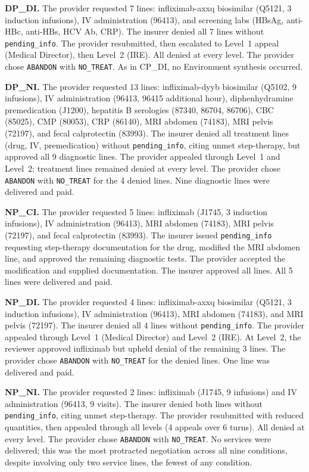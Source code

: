 \textbf{DP\_DI.} The provider requested 7 lines: infliximab-axxq biosimilar (Q5121, 3 induction infusions), IV administration (96413), and screening labs (HBsAg, anti-HBc, anti-HBs, HCV Ab, CRP). The insurer denied all 7 lines without \texttt{pending\_info}. The provider resubmitted, then escalated to Level~1 appeal (Medical Director), then Level~2 (IRE). All denied at every level. The provider chose \texttt{ABANDON} with \texttt{NO\_TREAT}. As in CP\_DI, no Environment synthesis occurred.

\textbf{DP\_NI.} The provider requested 13 lines: infliximab-dyyb biosimilar (Q5102, 9 infusions), IV administration (96413, 96415 additional hour), diphenhydramine premedication (J1200), hepatitis B serologies (87340, 86704, 86706), CBC (85025), CMP (80053), CRP (86140), MRI abdomen (74183), MRI pelvis (72197), and fecal calprotectin (83993). The insurer denied all treatment lines (drug, IV, premedication) without \texttt{pending\_info}, citing unmet step-therapy, but approved all 9 diagnostic lines. The provider appealed through Level~1 and Level~2; treatment lines remained denied at every level. The provider chose \texttt{ABANDON} with \texttt{NO\_TREAT} for the 4 denied lines. Nine diagnostic lines were delivered and paid.

\textbf{NP\_CI.} The provider requested 5 lines: infliximab (J1745, 3 induction infusions), IV administration (96413), MRI abdomen (74183), MRI pelvis (72197), and fecal calprotectin (83993). The insurer issued \texttt{pending\_info} requesting step-therapy documentation for the drug, modified the MRI abdomen line, and approved the remaining diagnostic tests. The provider accepted the modification and supplied documentation. The insurer approved all lines. All 5 lines were delivered and paid.

\textbf{NP\_DI.} The provider requested 4 lines: infliximab-axxq biosimilar (Q5121, 3 induction infusions), IV administration (96413), MRI abdomen (74183), and MRI pelvis (72197). The insurer denied all 4 lines without \texttt{pending\_info}. The provider appealed through Level~1 (Medical Director) and Level~2 (IRE). At Level~2, the reviewer approved infliximab but upheld denial of the remaining 3 lines. The provider chose \texttt{ABANDON} with \texttt{NO\_TREAT} for the denied lines. One line was delivered and paid.

\textbf{NP\_NI.} The provider requested 2 lines: infliximab (J1745, 9 infusions) and IV administration (96413, 9 visits). The insurer denied both lines without \texttt{pending\_info}, citing unmet step-therapy. The provider resubmitted with reduced quantities, then appealed through all levels (4 appeals over 6 turns). All denied at every level. The provider chose \texttt{ABANDON} with \texttt{NO\_TREAT}. No services were delivered; this was the most protracted negotiation across all nine conditions, despite involving only two service lines, the fewest of any condition.

